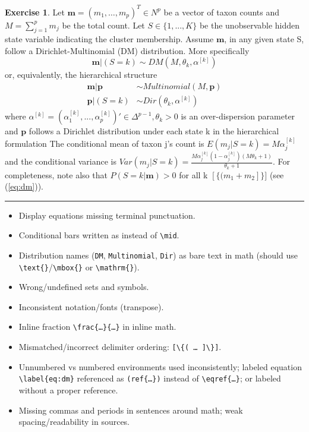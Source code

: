 \documentclass[
]{book}
\providecommand{\tightlist}{%
  \setlength{\itemsep}{0pt}\setlength{\parskip}{0pt}}
\theoremstyle{definition}
\theoremstyle{definition}
\theoremstyle{definition}
\newtheorem{exercise}{Exercise}[chapter]
\theoremstyle{definition}
\theoremstyle{remark}
\begin{document}
\begin{exercise}
Let \(\mathbf{m}=(m_1,\ldots,m_p)^T \in N^{p}\) be a vector of taxon counts
and \(M=\sum_{j=1}^{p} m_j\) be the total count. Let \(S \in \{1, ..., K\}\)
be the unobservable hidden state variable indicating the cluster membership.
Assume \(\mathbf{m}\), in any given state S, follow a Dirichlet-Multinomial (DM)
distribution. More specifically
\begin{equation}\label{eq:dm}
  \mathbf{m} | (S=k) \sim DM(M,\theta_k,\alpha^{[k]})
\end{equation}
or, equivalently, the hierarchical structure
\begin{equation*}
  \begin{aligned}
    \mathbf{m} | \mathbf{p} &\sim Multinomial(M,\mathbf{p}) \\
    \mathbf{p} | (S=k) &\sim Dir(\theta_k,\alpha^{[k]})
  \end{aligned}
\end{equation*}
where \(\alpha^{[k]}=(\alpha_{1}^{[k]},...,\alpha_{p}^{[k]})' \in \Delta^{p-1}, \theta_k>0\)
is an over-dispersion parameter and \(\mathbf{p}\) follows a Dirichlet distribution under
each state k in the hierarchical formulation
The conditional mean of taxon j's count is
\(E(m_{j} | S = k) = M\alpha_{j}^{[k]}\) and the conditional variance is
\(Var(m_j | S=k) = \frac{M\alpha_{j}^{[k]}(1-\alpha_{j}^{[k]})(M \theta_k + 1)}{\theta_k + 1}\).
For completeness, note also that \(P(S=k|\mathbf{m})>0\) for all k \([\{(m_1+m_2]\}]\) (see (\ref{eq:dm})).

\begin{center}\rule{0.5\linewidth}{0.5pt}\end{center}

\begin{itemize}
\tightlist
\item
  Display equations missing terminal punctuation.
\item
  Conditional bars written as \texttt{\textbar{}} instead of \texttt{\textbackslash{}mid}.
\item
  Distribution names (\texttt{DM}, \texttt{Multinomial}, \texttt{Dir}) as bare text in math (should use \texttt{\textbackslash{}text\{\}}/\texttt{\textbackslash{}mbox\{\}} or \texttt{\textbackslash{}mathrm\{\}}).
\item
  Wrong/undefined sets and symbols.
\item
  Inconsistent notation/fonts (transpose).
\item
  Inline fraction \texttt{\textbackslash{}frac\{…\}\{…\}} in inline math.
\item
  Mismatched/incorrect delimiter ordering: \texttt{{[}\textbackslash{}\{(\ …\ {]}\textbackslash{}\}{]}}.
\item
  Unnumbered vs numbered environments used inconsistently; labeled equation \texttt{\textbackslash{}label\{eq:dm\}} referenced as \texttt{(ref\{…\})} instead of \texttt{\textbackslash{}eqref\{…\}}; or labeled without a proper reference.
\item
  Missing commas and periods in sentences around math; weak spacing/readability in sources.
\end{itemize}

\end{exercise}
\end{document}
